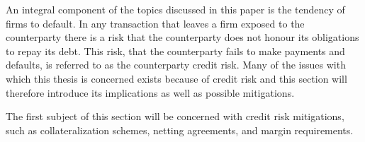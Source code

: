 \documentclass[main.tex]{subfiles}
\begin{document}
    An integral component of the topics discussed in this paper is the tendency of firms to default.
    In any transaction that leaves a firm exposed to the counterparty
    there is a risk that the counterparty does not honour its obligations to repay its debt.
    This risk, that the counterparty fails to make payments and defaults, 
    is referred to as the counterparty credit risk.
    Many of the issues with which this thesis is concerned exists because of credit risk 
    and this section will therefore introduce its implications as well as possible mitigations.

    The first subject of this section will be concerned with credit risk mitigations,
    such as collateralization schemes, netting agreements, and margin requirements.
\end{document}
